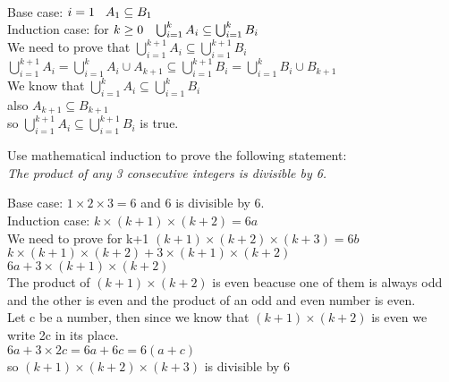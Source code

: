 \documentclass[addpoints,10pt,answers]{exam}
\begin{document}
\begin{questions}
\begin{solution}
\\Base case: $i=1 \hspace{3mm} A_1 \subseteq B_1$\\
Induction case: for $k \geq 0 \hspace{3mm}
\bigcup_{i = 1}^{k} A_i \subseteq \bigcup_{i = 1}^{k} B_i$\\
We need to prove that $\bigcup_{i = 1}^{k+1} A_i \subseteq \bigcup_{i = 1}^{k+1} B_i$\\
$\bigcup_{i = 1}^{k+1} A_i=\bigcup_{i = 1}^{k} A_i \cup A_{k+1}\subseteq \bigcup_{i = 1}^{k+1} B_i=\bigcup_{i = 1}^{k} B_i\cup B_{k+1}$\\
We know that $\bigcup_{i = 1}^{k} A_i \subseteq \bigcup_{i = 1}^{k} B_i$\\
also $A_{k+1}\subseteq B_{k+1}$\\
so $\bigcup_{i = 1}^{k+1} A_i \subseteq \bigcup_{i = 1}^{k+1} B_i$ is true.
\end{solution}


\question[12] Use mathematical induction to prove the following statement:\\

\emph{
The product of any 3 consecutive integers is divisible by 6. 
}
 

\begin{solution}
Base case: $1\times 2\times 3=6$ and 6 is divisible by 6.\\
Induction case: $k\times (k+1)\times (k+2)=6a$\\
We need to prove for k+1 \hspace{1mm} $(k+1)\times (k+2)\times (k+3) =6b$\\
$k\times (k+1)\times (k+2)+3\times (k+1)\times (k+2)$\\
$6a +3\times (k+1)\times (k+2) $\\
The product of $(k+1)\times (k+2)$ is even beacuse one of them is always odd and the other is even and the product of an odd and even number is even.\\
Let c be a number, then since we know that $(k+1)\times (k+2)$ is even we write 2c in its place.\\
$6a +3\times 2c=6a +6c=6(a+c) $\\
so $(k+1)\times (k+2)\times (k+3)$ is divisible by 6
 

\end{solution}
\end{questions}
\end{document}
